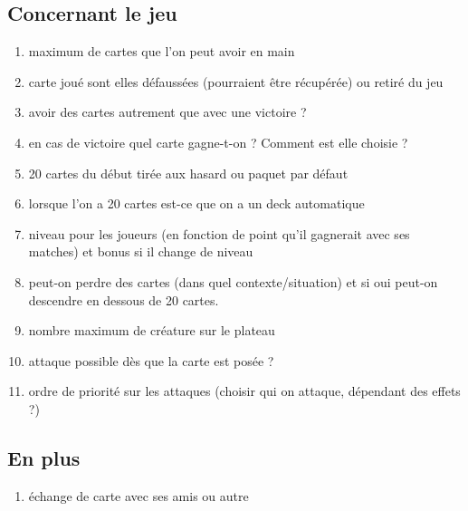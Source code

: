 \documentclass[11pt]{article}
\begin{document}
  \subsection{Concernant le jeu}
    \begin{enumerate}
    \item maximum de cartes que l'on peut avoir en main
    \item carte joué sont elles défaussées (pourraient être récupérée) ou retiré du jeu
    \item avoir des cartes autrement que avec une victoire ?
    \item en cas de victoire quel carte gagne-t-on ?  Comment est elle choisie ?
    \item 20 cartes du début tirée aux hasard ou paquet par défaut
    \item lorsque l'on a 20 cartes est-ce que on a un deck automatique
    \item niveau pour les joueurs (en fonction de point qu'il gagnerait avec ses matches) et bonus si il change de niveau
    \item peut-on perdre des cartes (dans quel contexte/situation) et si oui peut-on descendre en dessous de 20 cartes.
    \item nombre maximum de créature sur le plateau
    \item attaque possible dès que la carte est posée ?
    \item ordre de priorité sur les attaques (choisir qui on attaque, dépendant des effets ?)
    \end{enumerate}
    
  \subsection{En plus}
    \begin{enumerate}
    \item échange de carte avec ses amis ou autre
    \end{enumerate}


    
    
\end{document}
